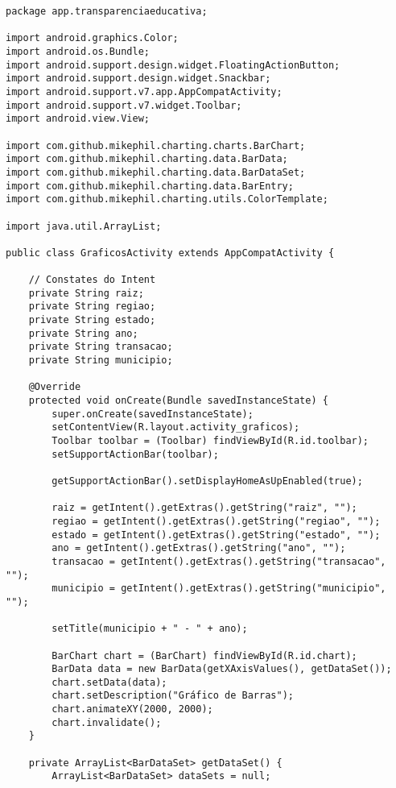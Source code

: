 \documentclass[12pt,a4paper]{article}
\begin{document}
\begin{lstlisting}[caption=./mobile/src/main/java/app/transparenciaeducativa/GraficosActivity.java]
package app.transparenciaeducativa;

import android.graphics.Color;
import android.os.Bundle;
import android.support.design.widget.FloatingActionButton;
import android.support.design.widget.Snackbar;
import android.support.v7.app.AppCompatActivity;
import android.support.v7.widget.Toolbar;
import android.view.View;

import com.github.mikephil.charting.charts.BarChart;
import com.github.mikephil.charting.data.BarData;
import com.github.mikephil.charting.data.BarDataSet;
import com.github.mikephil.charting.data.BarEntry;
import com.github.mikephil.charting.utils.ColorTemplate;

import java.util.ArrayList;

public class GraficosActivity extends AppCompatActivity {

    // Constates do Intent
    private String raiz;
    private String regiao;
    private String estado;
    private String ano;
    private String transacao;
    private String municipio;

    @Override
    protected void onCreate(Bundle savedInstanceState) {
        super.onCreate(savedInstanceState);
        setContentView(R.layout.activity_graficos);
        Toolbar toolbar = (Toolbar) findViewById(R.id.toolbar);
        setSupportActionBar(toolbar);

        getSupportActionBar().setDisplayHomeAsUpEnabled(true);

        raiz = getIntent().getExtras().getString("raiz", "");
        regiao = getIntent().getExtras().getString("regiao", "");
        estado = getIntent().getExtras().getString("estado", "");
        ano = getIntent().getExtras().getString("ano", "");
        transacao = getIntent().getExtras().getString("transacao", "");
        municipio = getIntent().getExtras().getString("municipio", "");

        setTitle(municipio + " - " + ano);

        BarChart chart = (BarChart) findViewById(R.id.chart);
        BarData data = new BarData(getXAxisValues(), getDataSet());
        chart.setData(data);
        chart.setDescription("Gráfico de Barras");
        chart.animateXY(2000, 2000);
        chart.invalidate();
    }

    private ArrayList<BarDataSet> getDataSet() {
        ArrayList<BarDataSet> dataSets = null;


\end{lstlisting}
\end{document}
